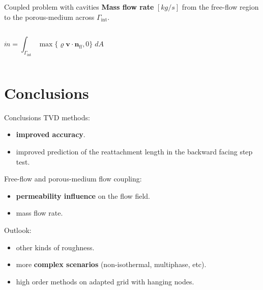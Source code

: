 \documentclass{beamer}
\begin{document}
\begin{frame}{Coupled problem with cavities}
\textbf{Mass flow rate} $[\si{kg/s}]$ from the free-flow region to the porous-medium across $\Gamma_\text{int}$.
\begin{columns}
	\begin{equation*}
	\dot{m} = \int_{\Gamma_\text{int}} \max \{ \varrho \mathbf{v} \cdot 
	\mathbf{n}_\text{ff} , 0 \} \; dA
	\end{equation*}
	\begin{figure}
		\centering
		
	\end{figure}
\end{columns}
\end{frame}
\section{Conclusions}
\begin{frame}{Conclusions}
TVD methods:
\begin{itemize}
	\item \textbf{improved accuracy}.
	\item improved prediction of the reattachment length in the backward facing step test.
\end{itemize}
Free-flow and porous-medium flow coupling:
\begin{itemize}
	\item \textbf{permeability influence} on the flow field.
	\item mass flow rate.
\end{itemize}
\pause
Outlook:
\begin{itemize}
	\item other kinds of roughness.
	\item more \textbf{complex scenarios} (non-isothermal, multiphase, etc).
	\item high order methods on adapted grid with hanging nodes.
\end{itemize}
\end{frame}
\end{document}
